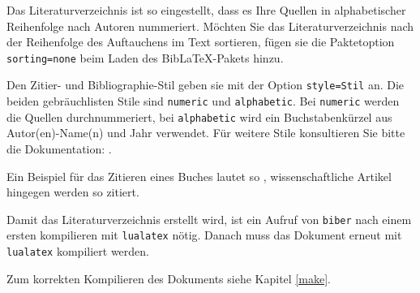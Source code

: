 Das Literaturverzeichnis ist so eingestellt, dass es Ihre Quellen in alphabetischer Reihenfolge nach Autoren nummeriert.
Möchten Sie das Literaturverzeichnis nach der Reihenfolge des Auftauchens im Text sortieren, fügen sie die Paktetoption \texttt{sorting=none} beim Laden
des BibLaTeX-Pakets hinzu.

Den Zitier- und Bibliographie-Stil geben sie mit der Option \texttt{style=Stil} an. Die beiden gebräuchlisten Stile sind \texttt{numeric} und \texttt{alphabetic}. 
Bei \texttt{numeric} werden die Quellen durchnummeriert, bei \texttt{alphabetic} wird ein Buchstabenkürzel aus Autor(en)-Name(n) und Jahr verwendet.
Für weitere Stile konsultieren Sie bitte die Dokumentation: \cite{biblatex}.

Ein Beispiel für das Zitieren eines Buches lautet so \cite{handbook_adhesives},
wissenschaftliche Artikel hingegen werden so \cite{einstein} zitiert.

Damit das Literaturverzeichnis erstellt wird, ist ein Aufruf von \texttt{biber} nach einem ersten kompilieren mit \texttt{lualatex} nötig.
Danach muss das Dokument erneut mit \texttt{lualatex} kompiliert werden. 

Zum korrekten Kompilieren des Dokuments siehe Kapitel \ref{make}.
